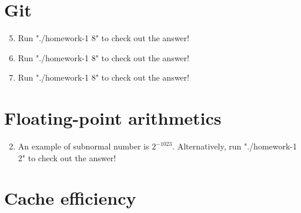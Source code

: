 \documentclass{article}    %
\begin{document}

\section{Git}

\begin{enumerate}
	\setcounter{enumi}{4}
	\item Run "./homework-1 8" to check out the answer!  
	\item Run "./homework-1 8" to check out the answer!
	\item Run "./homework-1 8" to check out the answer!
\end{enumerate}


\section{Floating-point arithmetics}

\begin{enumerate}
	\setcounter{enumi}{1}
	\item An example of subnormal number is $2^{-1023}$. Alternatively, run "./homework-1 2" to check out the answer!
	
	
\end{enumerate}

\section{Cache efficiency}
\end{document}
